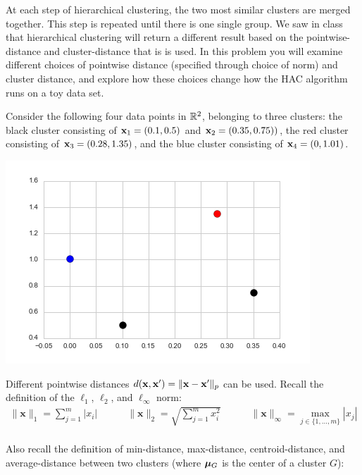 \documentclass[submit]{harvardml}
\begin{document}
\begin{problem}
  
At each step of hierarchical clustering, the two most similar clusters
are merged together. This step is repeated until there is one single
group. We saw in class that hierarchical clustering will return a
different result based on the pointwise-distance and cluster-distance
that is is used. In this problem you will examine different choices of
pointwise distance (specified through choice of norm) and cluster
distance, and explore how these choices change how the HAC algorithm
runs on a toy data set.

  
 Consider the following four data points in $\mathbb{R}^2$, belonging to three clusters: the
  black cluster consisting of $\mathbf{x}_1 = (0.1, 0.5) $ and $\mathbf{x}_2 = (0.35, 0.75))$,
  the red cluster consisting of $\mathbf{x}_3 = (0.28, 1.35)$, and the blue cluster
  consisting of $\mathbf{x}_4 = (0, 1.01)$.

  \begin{center} \includegraphics[scale=.3]{scatterplot.png} \end{center}


  Different pointwise distances $d(\mathbf{x}, \mathbf{x}') = \|\mathbf{x} - \mathbf{x}'\|_p$
  can be used.  Recall the definition of the
  $\ell_1$, $\ell_2$, and $\ell_{\infty}$ norm:
  \begin{eqnarray*}
     \| \mathbf{x} \|_1 = \sum_{j = 1}^m |x_i| \quad \quad\quad \| \mathbf{x} \|_2 = \sqrt{\sum_{j = 1}^m x_i^2 } \quad\quad\quad
     \| \mathbf{x} \|_{\infty} = \max_{j \in \{1, \ldots, m\}} |x_j|\\
  \end{eqnarray*}
  
  Also recall the definition of min-distance, max-distance,
  centroid-distance, and average-distance between two clusters (where $\boldsymbol{\mu}_{G}$
is the center of a cluster $G$):


\end{problem}
\end{document}
